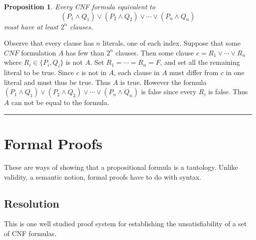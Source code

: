 \documentclass[twoside]{article}
\newtheorem{proposition}[theorem]{Proposition}
\newenvironment{proof}{{\bf Proof:}}{\hfill\rule{2mm}{2mm}}
\begin{document}
\begin{proposition}
Every CNF formula equivalent to 
\[(P_1 \land Q_1) \lor (P_2 \land Q_2) \lor \cdots \lor (P_n \land Q_n)\]
must have at least $2^n$ clauses. 
\end{proposition}
\begin{proof}
Observe that every clause has $n$ literals, one of each index. Suppose that some $CNF$ formulation $A$ has few than $2^n$ clauses. Then some clause $c = R_1 \lor \cdots \lor R_n$ where $R_i \in \{P_i, Q_i \}$ is not $A$. Set $R_1 = \cdots = R_n = F$, and set all the remaining literal to be true. Since $c$ is not in $A$, each clause in $A$ must differ from $c$ in one literal and must thus be true. Thus $A$ is true. However the formula $(P_1 \land Q_1) \lor (P_2 \land Q_2) \lor \cdots \lor (P_n \land Q_n)$ is false since every $R_i$ is false. Thus $A$ can not be equal to the formula.    
\end{proof}


\section{Formal Proofs}
These are ways of showing that a propositional formula is a tautology. Unlike validity, a semantic notion, formal proofs have to do with syntax.

\subsection{Resolution}
This is one well studied proof system for establishing the unsatisfiability of a set of CNF formulas. 
\end{document}
